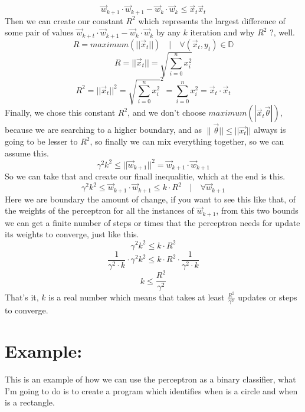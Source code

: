 \documentclass[12pt]{article}
\begin{document}
\[
  \vec{w}_{k + 1} \cdot \vec{w}_{k + 1} - \vec{w}_k \cdot \vec{w}_k
  \le \vec{x}_t\vec{x}_t
\]
Then we can create our constant $R^2$
 which represents the largest
difference of some pair of values $\vec{w}_{k+t} \cdot \vec{w}_{k+1} - \vec{w}_{k} \cdot \vec{w}_k$
by any $k$ iteration and why $R^2$ ?, well.
\[
  R = maximum(||\vec{x}_t||) \quad|\quad \forall (\vec{x}_t, y_t) \in \mathbb{D}
\]
\[
  R = ||\vec{x}_t|| = \sqrt{\sum_{i = 0}^{n}x_i^2}
\]
\[
  R^2 = ||\vec{x}_t||^2 = \sqrt{\sum_{i = 0}^{n}x_i^2}^2 = \sum_{i = 0}^{n}x_i^2 = \vec{x}_t \cdot \vec{x}_t
\]
Finally, we chose this constant $R^2$, and we don't choose $maximum(|\vec{x}_t\vec{\theta}|)$,
because we are searching to a higher boundary, and as $\|\vec{\theta}|| \le ||\vec{x_t}||$ always
is going to be lesser to $R^2$, so finally we can mix everything together, so we can assume this.
\[
  \gamma^2k^2 \le ||\vec{w}_{k+1}||^2 = \vec{w}_{k+1} \cdot \vec{w}_{k+1}
\]
So we can take that and create our finall inequalitie, which at the end is this.
\[
  \gamma^2k^2 \le \vec{w}_{k+1} \cdot \vec{w}_{k+1} \le k \cdot R^2\quad |\quad \forall\vec{w}_{k+1}
\]
Here we are boundary the amount of change, if you want to see this like
that, of the weights of the perceptron
for all the instances of $\vec{w}_{k + 1}$, from this two bounds we can get a finite number
of steps or times that the perceptron needs for update its weights to converge, just like this.
\[
  \gamma^2k^2 \le k \cdot R^2
\]
\[
  \frac{1}{\gamma^2 \cdot k} \cdot \gamma^2k^2 \le k \cdot R^2 \cdot \frac{1}{\gamma^2 \cdot k}
\]
\[
  k \le \frac{R^2}{\gamma^2}
\]
That's it, $k$ is a real number which means that takes at least $\frac{R^2}{\gamma^2}$
updates or steps to converge.
\section{Example:}
This is an example of how we can use the perceptron as a binary classifier, what I'm going to do
is to create a program which identifies when is a circle and when is a rectangle.
\end{document}
